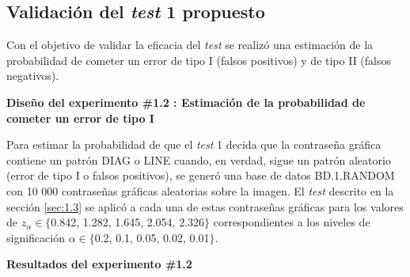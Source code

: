 \documentclass[12pt]{report}
\begin{document}
\subsection{Validación del \textit{test} 1 propuesto}
\label{sec:1.4}
	
	Con el objetivo de validar la eficacia del \textit{test} se realizó una estimación de la probabilidad de cometer un error de tipo I (falsos positivos) y de tipo II (falsos negativos).
		 
	\textbf{Diseño del experimento \#1.2 : Estimación de la probabilidad de cometer un error de tipo I} 
	
	Para estimar la probabilidad de que el \textit{test} 1 decida que la contraseña gráfica contiene un patrón DIAG o LINE cuando, en verdad, sigue un patrón aleatorio (error de tipo I o falsos positivos), se generó una base de datos BD.1.RANDOM con 10 000 contraseñas gráficas aleatorias sobre la imagen. El \textit{test} descrito en la sección \ref{sec:1.3} se aplicó a cada una de estas contraseñas gráficas para los valores de $z_\alpha \in \{$0.842, 1.282, 1.645, 2.054, 2.326$\}$ correspondientes a los niveles de significación $\alpha \in \{$0.2, 0.1, 0.05, 0.02, 0.01$\}$.
	


\textbf{Resultados del experimento \#1.2}
\end{document}
